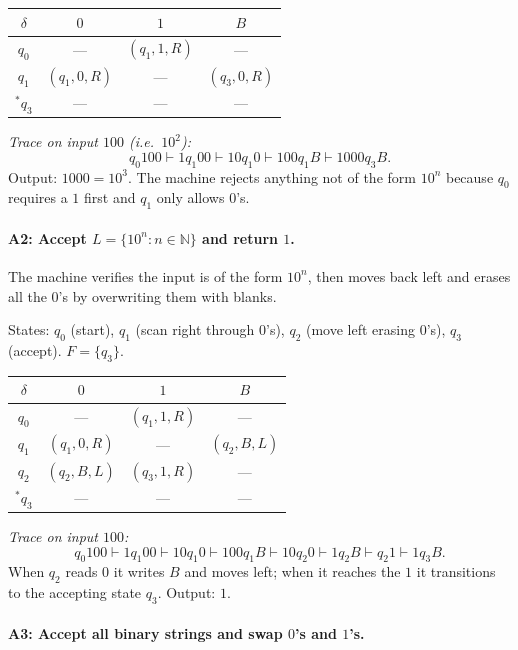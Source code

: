 \documentclass{article}
\theoremstyle{theorem}
\theoremstyle{definition}
\theoremstyle{remark}
\begin{document}
\begin{center}
\begin{tabular}{c|ccc}
$\delta$ & $0$ & $1$ & $B$ \\ \hline
$q_0$ & --- & $(q_1, 1, R)$ & --- \\
$q_1$ & $(q_1, 0, R)$ & --- & $(q_3, 0, R)$ \\
${}^*q_3$ & --- & --- & --- \\
\end{tabular}
\end{center}

\emph{Trace on input $100$ (i.e.\ $10^2$):}
\[
  q_0 100 \vdash 1q_1 00 \vdash 10q_1 0 \vdash 100q_1 B \vdash 1000q_3 B.
\]
Output: $1000 = 10^3$. The machine rejects anything not of the form $10^n$ because $q_0$ requires a $1$ first and $q_1$ only allows $0$'s.

\paragraph{A2: Accept $L = \{10^n : n \in \mathbb{N}\}$ and return $1$.}

The machine verifies the input is of the form $10^n$, then moves back left and erases all the $0$'s by overwriting them with blanks.

States: $q_0$ (start), $q_1$ (scan right through $0$'s), $q_2$ (move left erasing $0$'s), $q_3$ (accept). $F = \{q_3\}$.

\begin{center}
\begin{tabular}{c|ccc}
$\delta$ & $0$ & $1$ & $B$ \\ \hline
$q_0$ & --- & $(q_1, 1, R)$ & --- \\
$q_1$ & $(q_1, 0, R)$ & --- & $(q_2, B, L)$ \\
$q_2$ & $(q_2, B, L)$ & $(q_3, 1, R)$ & --- \\
${}^*q_3$ & --- & --- & --- \\
\end{tabular}
\end{center}

\emph{Trace on input $100$:}
\[
  q_0 100 \vdash 1q_1 00 \vdash 10q_1 0 \vdash 100q_1 B \vdash 10q_2 0 \vdash 1q_2 B \vdash q_2 1 \vdash 1q_3 B.
\]
When $q_2$ reads $0$ it writes $B$ and moves left; when it reaches the $1$ it transitions to the accepting state $q_3$. Output: $1$.

\paragraph{A3: Accept all binary strings and swap $0$'s and $1$'s.}
\end{document}
